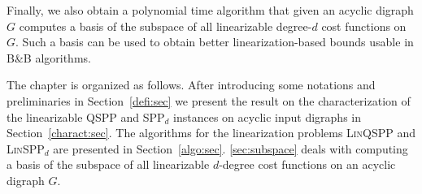 Finally, we also obtain a polynomial time algorithm that given an acyclic digraph $G$ computes a basis of the subspace of all linearizable degree-$d$ cost functions on $G$. Such a basis can be used to obtain better linearization-based bounds usable in B\&B algorithms.

The chapter is organized as follows. 
After introducing some notations and preliminaries in Section~\ref{defi:sec} we present the result on the characterization of the linearizable QSPP and SPP$_d$ instances on acyclic input digraphs in Section~\ref{charact:sec}. The algorithms for the linearization problems \textsc{Lin}QSPP and \textsc{Lin}SPP$_d$ are presented in Section~\ref{algo:sec}. 
\cref{sec:subspace} deals with 
computing a basis of the subspace of all linearizable $d$-degree cost functions on an acyclic digraph $G$.
